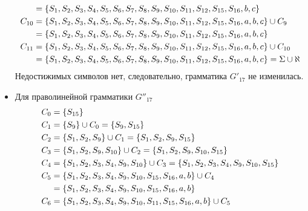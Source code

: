 \begin{itemize}
\begin{align*}
		             & = \left\{S_1, S_2, S_3, S_4, S_5, S_6, S_7, S_8, S_9, S_{10}, S_{11}, S_{12}, S_{15}, S_{16}, b, c\right\}                         \\
		      C_{10} & = \left\{S_1, S_2, S_3, S_4, S_5, S_6, S_7, S_8, S_9, S_{10}, S_{11}, S_{12}, S_{15}, S_{16}, a, b, c\right\} \cup C_{9}           \\
		             & = \left\{S_1, S_2, S_3, S_4, S_5, S_6, S_7, S_8, S_9, S_{10}, S_{11}, S_{12}, S_{15}, S_{16}, a, b, c\right\}                      \\
		      C_{11} & = \left\{S_1, S_2, S_3, S_4, S_5, S_6, S_7, S_8, S_9, S_{10}, S_{11}, S_{12}, S_{15}, S_{16}, a, b, c\right\} \cup C_{10}          \\
		             & = \left\{S_1, S_2, S_3, S_4, S_5, S_6, S_7, S_8, S_9, S_{10}, S_{11}, S_{12}, S_{15}, S_{16}, a, b, c\right\} = \Sigma \cup \aleph
	      \end{align*}
	      Недостижимых символов нет, следовательно, грамматика \(G'_{17}\) не изменилась.
	\item Для праволинейной грамматики \(G''_{17}\)
	      \begin{align*}
		      C_{0}  & = \cbr{S_{15}}                                                                                                            \\
		      C_{1}  & = \cbr{S_9} \cup C_{0} = \cbr{S_9, S_{15}}                                                                                \\
		      C_{2}  & = \cbr{S_1, S_2, S_9} \cup C_{1} = \cbr{S_1, S_2, S_9, S_{15}}                                                            \\
		      C_{3}  & = \cbr{S_1, S_2, S_9, S_{10}} \cup C_{2} = \cbr{S_1, S_2, S_9, S_{10}, S_{15}}                                            \\
		      C_{4}  & = \cbr{S_1, S_2, S_3, S_4, S_9, S_{10}} \cup C_{3} = \cbr{S_1, S_2, S_3, S_4, S_9, S_{10}, S_{15}}                        \\
		      C_{5}  & = \cbr{S_1, S_2, S_3, S_4, S_9, S_{10}, S_{15}, S_{16}, a, b} \cup C_{4}                                                  \\
		             & = \cbr{S_1, S_2, S_3, S_4, S_9, S_{10}, S_{15}, S_{16}, a, b}                                                             \\
		      C_{6}  & = \cbr{S_1, S_2, S_3, S_4, S_9, S_{10}, S_{11}, S_{15}, S_{16}, a, b} \cup C_{5}                                          \\

\end{align*}
\end{itemize}
